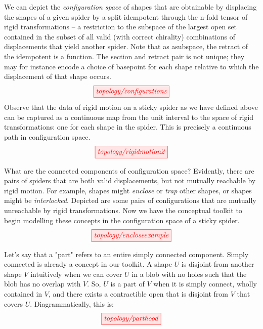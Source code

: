 \begin{myboxB}
\begin{defn}\label{defn:configurationspace}
We can depict the \emph{configuration space} of shapes that are obtainable by displacing the shapes of a given spider by a split idempotent through the n-fold tensor of rigid transformations -- a restriction to the subspace of the largest open set contained in the subset of all valid (with correct chirality) combinations of displacements that yield another spider. Note that as asubspace, the retract of the idempotent is a function. The section and retract pair is not unique; they may for instance encode a choice of basepoint for each shape relative to which the displacement of that shape occurs.
\[\tikzfig{topology/configurations}\]
Observe that the data of rigid motion on a sticky spider as we have defined above can be captured as a continuous map from the unit interval to the space of rigid transformations: one for each shape in the spider. This is precisely a continuous path in configuration space.
\[\tikzfig{topology/rigidmotion2}\]
\end{defn}
\end{myboxB}

\begin{myboxR}
\begin{example}
What are the connected components of configuration space? Evidently, there are pairs of spiders that are both valid displacements, but not mutually reachable by rigid motion. For example, shapes might \emph{enclose} or \emph{trap} other shapes, or shapes might be \emph{interlocked}. Depicted are some pairs of configurations that are mutually unreachable by rigid transformations. Now we have the conceptual toolkit to begin modelling these concepts in the configuration space of a sticky spider.
\[\tikzfig{topology/encloseexample}\]
\end{example}
\end{myboxR}


\begin{myboxB}
\begin{defn}\label{defn:parthood}
Let's say that a "part" refers to an entire simply connected component. Simply connected is already a concept in our toolkit. A shape $U$ is disjoint from another shape $V$ intuitively when we can cover $U$ in a blob with no holes such that the blob has no overlap with $V$. So, $U$ is a part of $V$ when it is simply connect, wholly contained in $V$, and there exists a contractible open that is disjoint from $V$ that covers $U$. Diagrammatically, this is:
\[\tikzfig{topology/parthood}\]
\end{defn}

\end{myboxB}

